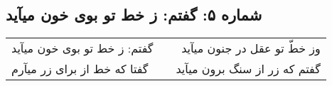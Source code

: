 \begin{center}
\section*{شماره ۵: گفتم: ز خط تو بوی خون میآید}
\label{sec:005}
\begin{longtable}{l p{0.5cm} r}
گفتم: ز خط تو بوی خون میآید
&&
وز خطّ تو عقل در جنون میآید
\\
گفتا که خط از برای زر میآرم
&&
گفتم که زر از سنگ برون میآید
\\
\end{longtable}
\end{center}
